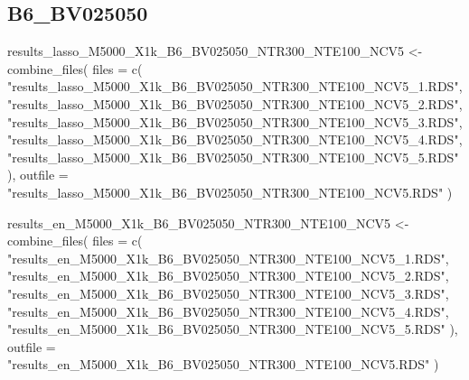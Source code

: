 \documentclass[
]{article}
\newenvironment{Shaded}{\begin{snugshade}}{\end{snugshade}}
\newcommand{\AttributeTok}[1]{\textcolor[rgb]{0.77,0.63,0.00}{#1}}
\newcommand{\FunctionTok}[1]{\textcolor[rgb]{0.00,0.00,0.00}{#1}}
\newcommand{\NormalTok}[1]{#1}
\newcommand{\OtherTok}[1]{\textcolor[rgb]{0.56,0.35,0.01}{#1}}
\newcommand{\StringTok}[1]{\textcolor[rgb]{0.31,0.60,0.02}{#1}}
\begin{document}
\hypertarget{b6_bv025050}{%
\subsection{B6\_BV025050}\label{b6_bv025050}}

\begin{Shaded}
\begin{Highlighting}[]
\NormalTok{results\_lasso\_M5000\_X1k\_B6\_BV025050\_NTR300\_NTE100\_NCV5 }\OtherTok{\textless{}{-}} \FunctionTok{combine\_files}\NormalTok{(}
  \AttributeTok{files =} \FunctionTok{c}\NormalTok{(}
    \StringTok{"results\_lasso\_M5000\_X1k\_B6\_BV025050\_NTR300\_NTE100\_NCV5\_1.RDS"}\NormalTok{,}
    \StringTok{"results\_lasso\_M5000\_X1k\_B6\_BV025050\_NTR300\_NTE100\_NCV5\_2.RDS"}\NormalTok{,}
    \StringTok{"results\_lasso\_M5000\_X1k\_B6\_BV025050\_NTR300\_NTE100\_NCV5\_3.RDS"}\NormalTok{,}
    \StringTok{"results\_lasso\_M5000\_X1k\_B6\_BV025050\_NTR300\_NTE100\_NCV5\_4.RDS"}\NormalTok{,}
    \StringTok{"results\_lasso\_M5000\_X1k\_B6\_BV025050\_NTR300\_NTE100\_NCV5\_5.RDS"}
\NormalTok{  ),}
  \AttributeTok{outfile =} \StringTok{"results\_lasso\_M5000\_X1k\_B6\_BV025050\_NTR300\_NTE100\_NCV5.RDS"}
\NormalTok{)}

\NormalTok{results\_en\_M5000\_X1k\_B6\_BV025050\_NTR300\_NTE100\_NCV5 }\OtherTok{\textless{}{-}} \FunctionTok{combine\_files}\NormalTok{(}
  \AttributeTok{files =} \FunctionTok{c}\NormalTok{(}
    \StringTok{"results\_en\_M5000\_X1k\_B6\_BV025050\_NTR300\_NTE100\_NCV5\_1.RDS"}\NormalTok{,}
    \StringTok{"results\_en\_M5000\_X1k\_B6\_BV025050\_NTR300\_NTE100\_NCV5\_2.RDS"}\NormalTok{,}
    \StringTok{"results\_en\_M5000\_X1k\_B6\_BV025050\_NTR300\_NTE100\_NCV5\_3.RDS"}\NormalTok{,}
    \StringTok{"results\_en\_M5000\_X1k\_B6\_BV025050\_NTR300\_NTE100\_NCV5\_4.RDS"}\NormalTok{,}
    \StringTok{"results\_en\_M5000\_X1k\_B6\_BV025050\_NTR300\_NTE100\_NCV5\_5.RDS"}
\NormalTok{  ),}
  \AttributeTok{outfile =} \StringTok{"results\_en\_M5000\_X1k\_B6\_BV025050\_NTR300\_NTE100\_NCV5.RDS"}
\NormalTok{)}


\end{Highlighting}
\end{Shaded}
\end{document}
